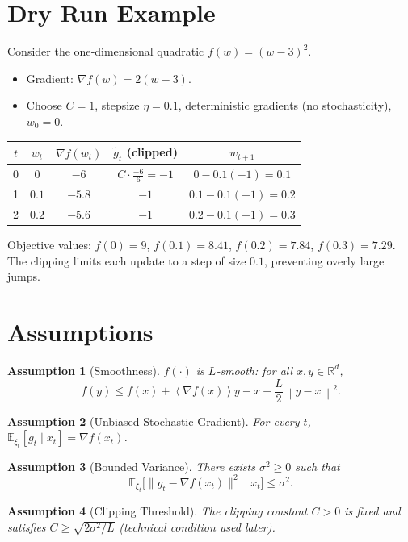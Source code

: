 \documentclass{article}
\newtheorem{assumption}{Assumption}
\newcommand{\E}{\mathbb{E}}
\newcommand{\norm}[1]{\left\lVert #1\right\rVert}
\newcommand{\inner}[1]{\left\langle #1\right\rangle}
\begin{document}
\section*{Dry Run Example}
Consider the one‑dimensional quadratic $f(w)=(w-3)^2$.
\begin{itemize}
    \item Gradient: $\nabla f(w)=2(w-3)$.
    \item Choose $C=1$, stepsize $\eta=0.1$, deterministic gradients (no stochasticity), $w_0=0$.
\end{itemize}
\begin{center}
\begin{tabular}{c|c|c|c|c}
$t$ & $w_t$ & $\nabla f(w_t)$ & $\tilde g_t$ (clipped) & $w_{t+1}$ \\ \hline
0 & $0$ & $-6$ & $C\cdot\frac{-6}{6}= -1$ & $0-0.1(-1)=0.1$\\
1 & $0.1$ & $-5.8$ & $-1$ & $0.1-0.1(-1)=0.2$\\
2 & $0.2$ & $-5.6$ & $-1$ & $0.2-0.1(-1)=0.3$
\end{tabular}
\end{center}
Objective values: $f(0)=9$, $f(0.1)=8.41$, $f(0.2)=7.84$, $f(0.3)=7.29$.
The clipping limits each update to a step of size $0.1$, preventing overly large jumps.

\newpage

\section*{Assumptions}
\begin{assumption}[Smoothness]\label{as:smooth}
$f(\cdot)$ is $L$‑smooth: for all $x,y\in\mathbb{R}^d$,
\[
f(y)\le f(x)+\inner{\nabla f(x)}{y-x}+\frac{L}{2}\norm{y-x}^2 .
\]
\end{assumption}
\begin{assumption}[Unbiased Stochastic Gradient]\label{as:unbiased}
For every $t$, $\E_{\xi_t}[g_t\mid x_t]=\nabla f(x_t)$.
\end{assumption}
\begin{assumption}[Bounded Variance]\label{as:variance}
There exists $\sigma^2\ge0$ such that
\[
\E_{\xi_t}\!\bigl[\|g_t-\nabla f(x_t)\|^2\mid x_t\bigr]\le\sigma^2 .
\]
\end{assumption}
\begin{assumption}[Clipping Threshold]\label{as:threshold}
The clipping constant $C>0$ is fixed and satisfies $C\ge \sqrt{2\sigma^2/L}$ (technical condition used later).
\end{assumption}
\end{document}
